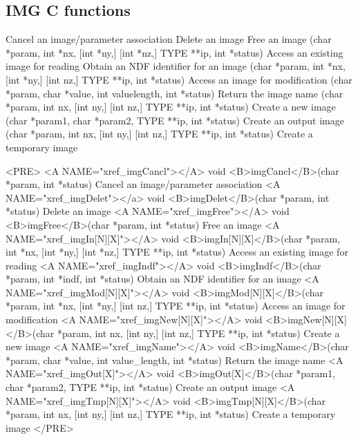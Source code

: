 \documentclass[twoside,11pt]{article}
\newenvironment{latexonly}{}{}
\renewcommand{\_}{\texttt{\symbol{95}}}
\begin{document}
\subsection{IMG C functions}
\begin{latexonly}
{\small
\begin{description}
     {Cancel an image/parameter association}
     {Delete an image}
     {Free an image}
     {(char *param, int *nx, [int *ny,] [int *nz,] TYPE **ip, int *status)}
     {Access an existing image for reading}
     {Obtain an NDF identifier for an image}
     {(char *param, int *nx, [int *ny,] [int nz,] TYPE **ip, int *status)}
     {Access an image for modification}
     {(char *param, char *value, int value\_length, int *status)}
     {Return the image name}
     {(char *param, int nx, [int ny,] [int nz,] TYPE **ip, int *status)}
     {Create a new image}
     {(char *param1, char *param2, TYPE **ip, int *status)}
     {Create an output image}
     {(char *param, int nx, [int ny,] [int nz,] TYPE **ip, int *status)}
     {Create a temporary image}
\end{description}
}
\end{latexonly}
\begin{rawhtml}
<PRE>
<A NAME="xref_imgCancl"></A>
  void <B>imgCancl</B>(char *param, int *status) 
     Cancel an image/parameter association 
<A NAME="xref_imgDelet"></a>
  void <B>imgDelet</B>(char *param, int *status) 
     Delete an image 
<A NAME="xref_imgFree"></A>
  void <B>imgFree</B>(char *param, int *status) 
     Free an image 
<A NAME="xref_imgIn[N][X]"></A>
  void <B>imgIn[N][X]</B>(char *param, int *nx, [int *ny,] [int *nz,] TYPE **ip, int *status) 
     Access an existing image for reading 
<A NAME="xref_imgIndf"></A>
  void <B>imgIndf</B>(char *param, int *indf, int *status) 
     Obtain an NDF identifier for an image 
<A NAME="xref_imgMod[N][X]"></A>
  void <B>imgMod[N][X]</B>(char *param, int *nx, [int *ny,] [int nz,] TYPE **ip, int *status) 
     Access an image for modification 
<A NAME="xref_imgNew[N][X]"></A>
  void <B>imgNew[N][X]</B>(char *param, int nx, [int ny,] [int nz,] TYPE **ip, int *status) 
     Create a new image 
<A NAME="xref_imgName"></A>
  void <B>imgName</B>(char *param, char *value, int value_length, int *status) 
     Return the image name
<A NAME="xref_imgOut[X]"></A>
  void <B>imgOut[X]</B>(char *param1, char *param2, TYPE **ip, int *status) 
     Create an output image 
<A NAME="xref_imgTmp[N][X]"></A>
  void <B>imgTmp[N][X]</B>(char *param, int nx, [int ny,] [int nz,] TYPE **ip, int *status) 
     Create a temporary image 
</PRE>
\end{rawhtml}
\end{document}
